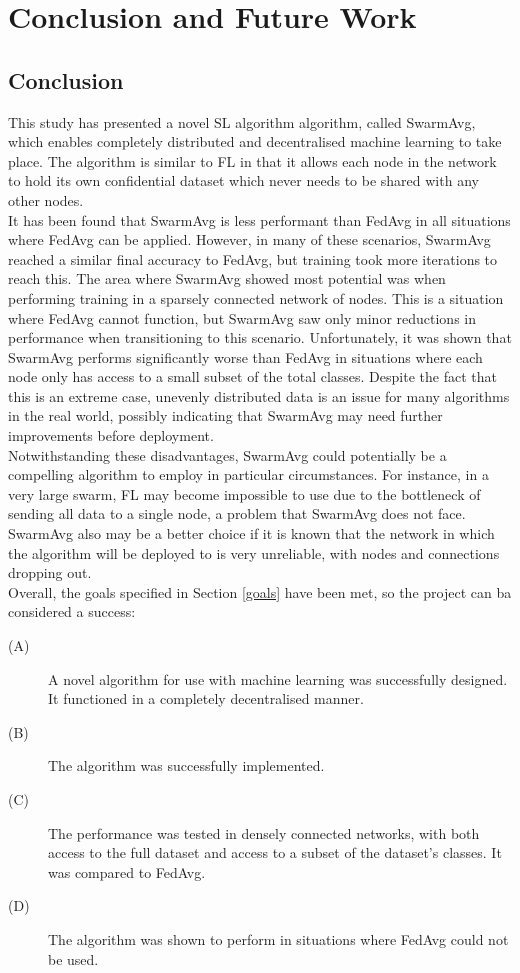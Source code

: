 \chapter{Conclusion and Future Work}
\section{Conclusion}
This study has presented a novel SL algorithm algorithm, called SwarmAvg, which enables completely distributed and decentralised machine learning to take place. The algorithm is similar to FL in that it allows each node in the network to hold its own confidential dataset which never needs to be shared with any other nodes. \\

It has been found that SwarmAvg is less performant than FedAvg in all situations where FedAvg can be applied. However, in many of these scenarios, SwarmAvg reached a similar final accuracy to FedAvg, but training took more iterations to reach this. The area where SwarmAvg showed most potential was when performing training in a sparsely connected network of nodes. This is a situation where FedAvg cannot function, but SwarmAvg saw only minor reductions in performance when transitioning to this scenario. Unfortunately, it was shown that SwarmAvg performs significantly worse than FedAvg in situations where each node only has access to a small subset of the total classes. Despite the fact that this is an extreme case, unevenly distributed data is an issue for many algorithms in the real world, possibly indicating that SwarmAvg may need further improvements before deployment. \\

Notwithstanding these disadvantages, SwarmAvg could potentially be a compelling algorithm to employ in particular circumstances. For instance, in a very large swarm, FL may become impossible to use due to the bottleneck of sending all data to a single node, a problem that SwarmAvg does not face. SwarmAvg also may be a better choice if it is known that the network in which the algorithm will be deployed to is very unreliable, with nodes and connections dropping out. \\

Overall, the goals specified in Section \ref{goals} have been met, so the project can ba considered a success:
\begin{description}
	\item[(A)] A novel algorithm for use with machine learning was successfully designed. It functioned in a completely decentralised manner.
	\item[(B)] The algorithm was successfully implemented.
	\item[(C)] The performance was tested in densely connected networks, with both access to the full dataset and access to a subset of the dataset's classes. It was compared to FedAvg.
	\item[(D)] The algorithm was shown to perform in situations where FedAvg could not be used.
\end{description}

